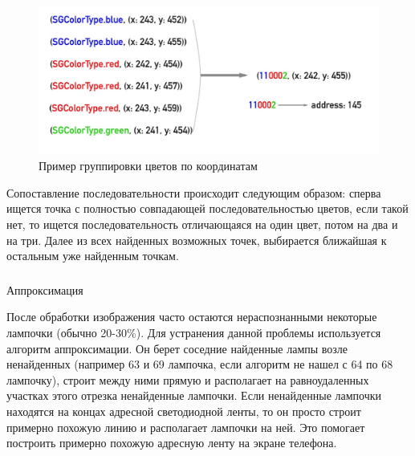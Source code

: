 ~
\begin{figure}[H]
\centering
	\includegraphics[scale=0.35]{figures/calibration_grouping.jpg}
	\caption{Пример группировки цветов по координатам}
	\label{fig:develop:algorithm:grouping}
\end{figure}

Сопоставление последовательности происходит следующим образом: сперва ищется точка с полностью совпадающей последовательностью цветов, если такой нет, то ищется последовательность отличающаяся на один цвет, потом на два и на три. Далее из всех найденных возможных точек, выбирается ближайшая к остальным уже найденным точкам.

\subsubsection{} Аппроксимация
\label{sec:develop:algorithm:approximation}

После обработки изображения часто остаются нераспознанными некоторые лампочки (обычно 20-30\%). Для устранения данной проблемы используется алгоритм аппроксимации. Он берет соседние найденные лампы возле ненайденных (например 63 и 69 лампочка, если алгоритм не нашел с 64 по 68 лампочку), строит между ними прямую и располагает на равноудаленных участках этого отрезка ненайденные лампочки. Если ненайденные лампочки находятся на концах адресной светодиодной ленты, то он просто строит примерно похожую линию и располагает лампочки на ней. Это помогает построить примерно похожую адресную ленту на экране телефона.

